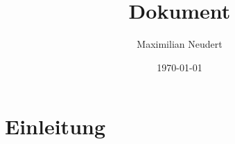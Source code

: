 \documentclass{article}
\title{Dokument}
\author{Maximilian Neudert}
\date{\today}
\begin{document}
\maketitle

\section{Einleitung}

\lipsum[1-2]
\end{document}
